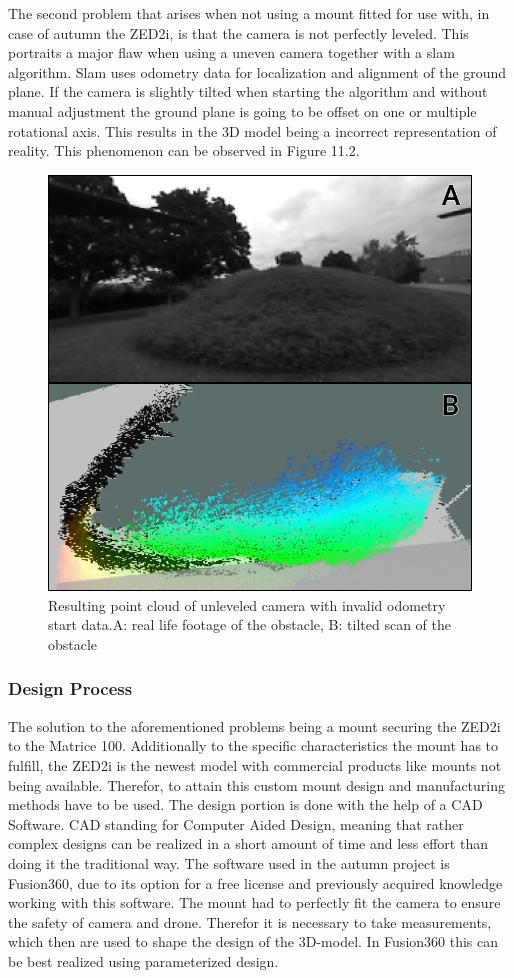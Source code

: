 The second problem that arises when not using a mount fitted for use with, in case of autumn the ZED2i, is that the camera is not perfectly leveled. This portraits a major flaw when using a uneven camera together with a slam algorithm. Slam uses odometry data for localization and alignment of the ground plane. If the camera is slightly tilted when starting the algorithm and without manual adjustment the ground plane is going to be offset on one or multiple rotational axis. This results in the 3D model being a incorrect representation of reality. This phenomenon can be observed in Figure 11.2.

\begin{figure}[h]
	\centering
	\includegraphics[width=0.5\linewidth]{img/MisalignedOdom}
	\caption{Resulting point cloud of unleveled camera with invalid odometry start data.\newline A: real life footage of the obstacle, B: tilted scan of the obstacle}
	\label{fig:custom_parts_misalignedOdom}
\end{figure}

\subsubsection{Design Process}

The solution to the aforementioned problems being a mount securing the ZED2i to the Matrice 100. Additionally to the specific characteristics the mount has to fulfill, the ZED2i is the newest model with commercial products like mounts not being available. Therefor, to attain this custom mount design and manufacturing methods have to be used. 
The design portion is done with the help of a CAD Software. CAD standing for Computer Aided Design, meaning that rather complex designs can be realized in a short amount of time and less effort than doing it the traditional way. The software used in the autumn project is Fusion360, due to its option for a free license and previously acquired knowledge working with this software. 
The mount had to perfectly fit the camera to ensure the safety of camera and drone. Therefor it is necessary to take measurements, which then are used to shape the design of the 3D-model. In Fusion360 this can be best realized using parameterized design. 


